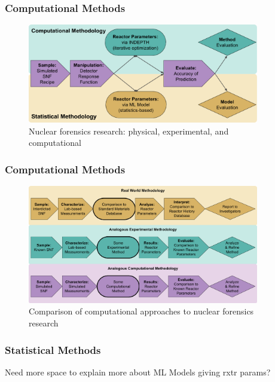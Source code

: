 
\begin{frame}
  \frametitle{Computational Methods}
  \begin{figure}[h!]
    \centering
    \includegraphics[width=0.9\textwidth]{./figures/CompStatForensicsWorkflow.png}
    \caption{Nuclear forensics research: physical, experimental, and computational}
  \end{figure}
\end{frame}

\begin{frame}
  \frametitle{Computational Methods}
  \begin{figure}[h!]
    \centering
    \includegraphics[width=0.9\textwidth]{./figures/ForensicsWorkflows.png}
    \caption{Comparison of computational approaches to nuclear forensics research}
  \end{figure}
\end{frame}

\begin{frame}
  \frametitle{Statistical Methods}
  Need more space to explain more about ML Models giving rxtr params? 
\end{frame}

